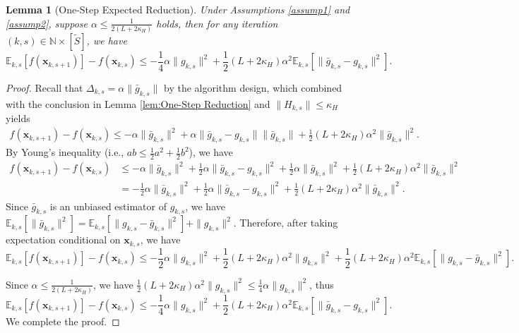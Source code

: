 \documentclass{article}
\newcommand{\bx}{\boldsymbol{x}}
\newcommand{\barg}{\bar{g}}
\theoremstyle{plain}
\newtheorem{lemma}[theorem]{Lemma}
\theoremstyle{definition}
\theoremstyle{remark}
\begin{document}
\begin{lemma}[One-Step Expected Reduction]\label{lem: One-Step Expected Reduction}
Under Assumptions \ref{assump1} and \ref{assump2}, suppose
$\alpha \leq \frac{1}{2(L + 2\kappa_H)}$ holds, then for any iteration $(k,s)\in \mathbb{N}\times [\tilde{S}]$,  we have
\begin{equation*}
     \mathbb{E}_{k,s}[f(\bx_{k,s+1})] - f(\bx_{k,s}) \leq -\frac{1}{4}\alpha\|g_{k,s}\|^2 + \frac{1}{2}(L + 2\kappa_H)\alpha^2\mathbb{E}_{k,s}[\| \barg_{k,s} - g_{k,s}\|^2].
\end{equation*}
\end{lemma}

\begin{proof}
Recall that $\Delta_{k,s} = \alpha\|\barg_{k,s}\|$ by the algorithm design, which combined with the conclusion in Lemma \ref{lem:One-Step Reduction} and $\|H_{k,s}\| \leq \kappa_H$ yields
\begin{align*}
f(\bx_{k,s+1}) - f(\bx_{k,s}) \leq -\alpha\|\barg_{k,s}\|^2  + \alpha\|\barg_{k,s} - g_{k,s} \| \|\barg_{k,s}\| + \frac{1}{2}(L + 2 \kappa_H)\alpha^2\|\barg_{k,s}\|^2.
\end{align*}
By Young's inequality (i.e., $ab \leq \frac{1}{2}a^2 + \frac{1}{2}b^2$), we have
\begin{align*}
f(\bx_{k,s+1}) - f(\bx_{k,s}) &\leq -\alpha\|\barg_{k,s}\|^2  + \frac{1}{2}\alpha\|\barg_{k,s} - g_{k,s} \|^2 + \frac{1}{2}\alpha\|\barg_{k,s}\|^2 + \frac{1}{2}(L + 2 \kappa_H)\alpha^2\|\barg_{k,s}\|^2 \\
& = - \frac{1}{2} \alpha\|\barg_{k,s}\|^2  + \frac{1}{2}\alpha\|\barg_{k,s} - g_{k,s} \|^2  + \frac{1}{2}(L + 2 \kappa_H)\alpha^2\|\barg_{k,s}\|^2.
\end{align*}
Since $\bar{g}_{k,s}$ is an unbiased estimator of $g_{k,s}$, we have $ \mathbb{E}_{k,s}[\|\bar{g}_{k,s}\|^2] = \mathbb{E}_{k,s}[\|g_{k,s} - \bar{g}_{k,s}\|^2] + \|g_{k,s}\|^2$. Therefore, after taking expectation conditional on $\bx_{k,s}$, we have
\begin{equation*}
\mathbb{E}_{k,s}[f(\bx_{k,s+1})] - f(\bx_{k,s}) \leq -\frac{1}{2}\alpha\|g_{k,s}\|^2 + \frac{1}{2}(L+ 2\kappa_H)\alpha^2\|g_{k,s}\|^2 + \frac{1}{2}(L+ 2\kappa_H)\alpha^2\mathbb{E}_{k,s}[\|g_{k,s} - \barg_{k,s}\|^2].
\end{equation*}

Since $\alpha \leq \frac{1}{2(L+ 2\kappa_H)}$, we have $ \frac{1}{2}(L+ 2\kappa_H)\alpha^2\|g_{k,s}\|^2 \leq \frac{1}{4}\alpha\|g_{k,s}\|^2$, thus
\begin{equation*}
     \mathbb{E}_{k,s}[f(\bx_{k,s+1})] - f(\bx_{k,s}) \leq -\frac{1}{4}\alpha\|g_{k,s}\|^2 + \frac{1}{2}(L + 2\kappa_H)\alpha^2\mathbb{E}_{k,s}[\|\bar{g}_{k,s} - g_{k,s} \|^2].
\end{equation*}
We complete the proof.
\end{proof}
\end{document}
